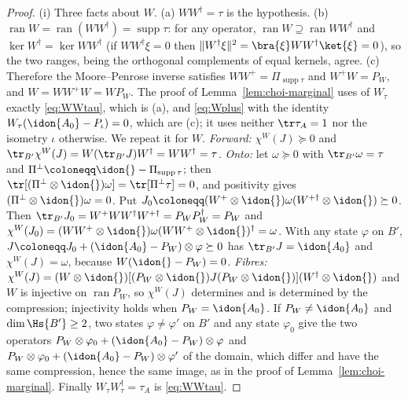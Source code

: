 \begin{proof}
(i) Three facts about $W$. (a) $WW^{\dagger}=\tau$ is the hypothesis. (b)
$\operatorname{ran}W=\operatorname{ran}(WW^{\dagger})=\operatorname{supp}\tau$:
for any operator, $\operatorname{ran}W\supseteq\operatorname{ran}WW^{\dagger}$
and $\ker W^{\dagger}=\ker WW^{\dagger}$ (if $WW^{\dagger}\xi=0$ then
$\|W^{\dagger}\xi\|^2=\bra{\xi}WW^{\dagger}\ket{\xi}=0$), so the two ranges,
being the orthogonal complements of equal kernels, agree. (c) Therefore the
Moore--Penrose inverse satisfies
$WW^{+}=\Pi_{\operatorname{supp}\tau}$ and $W^{+}W=P_W$, and
$W=WW^{+}W=WP_W$. The proof of Lemma~\ref{lem:choi-marginal} uses of
$W_{\tau}$ exactly \eqref{eq:WWtau}, which is (a), and \eqref{eq:Wplus} with
the identity $W_{\tau}(\idon{A_0}-P_{\iota})=0$, which are (c); it uses
neither $\tr\tau_A=1$ nor the isometry $\iota$ otherwise. We repeat it for
$W$. \emph{Forward:} $\chi^{W}(J)\succeq0$ and
$\tr_{B'}\chi^{W}(J)=W(\tr_{B'}J)W^{\dagger}=WW^{\dagger}=\tau$.
\emph{Onto:} let $\omega\succeq0$ with $\tr_{B'}\omega=\tau$ and
$\Pi^{\perp}\coloneqq\idon{}-\Pi_{\operatorname{supp}\tau}$; then
$\tr[(\Pi^{\perp}\otimes\idon{})\omega]=\tr[\Pi^{\perp}\tau]=0$, and
positivity gives $(\Pi^{\perp}\otimes\idon{})\omega=0$. Put
$J_0\coloneqq(W^{+}\otimes\idon{})\omega(W^{+\dagger}\otimes\idon{})\succeq0$.
Then $\tr_{B'}J_0=W^{+}WW^{\dagger}W^{+\dagger}=P_WP_W^{\dagger}=P_W$ and
$\chi^{W}(J_0)=(WW^{+}\otimes\idon{})\omega(WW^{+}\otimes\idon{})^{\dagger}
=\omega$. With any state $\varphi$ on $B'$,
$J\coloneqq J_0+(\idon{A_0}-P_W)\otimes\varphi\succeq0$ has
$\tr_{B'}J=\idon{A_0}$ and $\chi^{W}(J)=\omega$, because
$W(\idon{}-P_W)=0$. \emph{Fibres:} $\chi^{W}(J)=(W\otimes\idon{})
[(P_W\otimes\idon{})J(P_W\otimes\idon{})](W^{\dagger}\otimes\idon{})$ and $W$
is injective on $\operatorname{ran}P_W$, so $\chi^{W}(J)$ determines and is
determined by the compression; injectivity holds when $P_W=\idon{A_0}$. If
$P_W\ne\idon{A_0}$ and $\dim\Hs{B'}\ge2$, two states $\varphi\ne\varphi'$
on $B'$ and any state $\varphi_0$ give the two operators
$P_W\otimes\varphi_0+(\idon{A_0}-P_W)\otimes\varphi$ and
$P_W\otimes\varphi_0+(\idon{A_0}-P_W)\otimes\varphi'$ of the domain, which
differ and have the same compression, hence the same image, as in the proof
of Lemma~\ref{lem:choi-marginal}. Finally $W_{\tau}W_{\tau}^{\dagger}=\tau_A$ is
\eqref{eq:WWtau}.


\end{proof}
